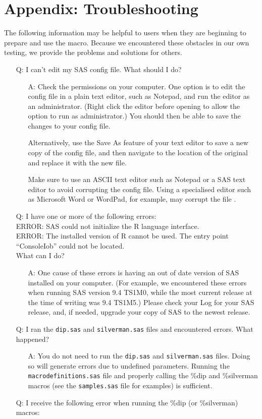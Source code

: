 \documentclass[]{interact}
\theoremstyle{plain}%
\theoremstyle{definition}
\theoremstyle{remark}
\begin{document}
\section{Appendix: Troubleshooting}
The following information may be helpful to users when they are beginning to prepare and use the macro. Because we encountered these obstacles in our own testing, we provide the problems and solutions for others.
\begin{itemize}
\item[Q:] I can't edit my SAS config file. What should I do?
\begin{itemize}
\item[A:] Check the permissions on your computer. One option is to edit the config file in a plain text editor, such as Notepad, and run the editor as an administrator. (Right click the editor before opening to allow the option to run as administrator.) You should then be able to save the changes to your config file. 

Alternatively, use the Save As feature of your text editor to save a new copy of the config file, and then navigate to the location of the original and replace it with the new file. 

Make sure to use an ASCII text editor such as Notepad or a SAS text editor to avoid corrupting the config file. Using a specialised editor such as Microsoft Word or WordPad, for example, may corrupt the file \citep[p. 14]{SAS-config}.
\end{itemize}
\item[Q:] I have one or more of the following errors: \\
ERROR: SAS could not initialize the R language interface. \\
ERROR: The installed version of R cannot be used.  The entry point ``ConsoleIob'' could not be located. \\
What can I do?
\begin{itemize}
\item[A:] One cause of these errors is having an out of date version of SAS installed on your computer. (For example, we encountered these errors when running SAS version 9.4 TS1M0, while the most current release at the time of writing was 9.4 TS1M5.)  Please check your Log for your SAS release, and, if needed, upgrade your copy of SAS to the newest release. 
\end{itemize}
\item[Q:] I ran the \texttt{dip.sas} and \texttt{silverman.sas} files and encountered errors. What happened? 
\begin{itemize}
\item[A:]  You do not need to run the \texttt{dip.sas} and \texttt{silverman.sas} files. Doing so will generate errors due to undefined parameters. Running the \texttt{macrodefinitions.sas} file and properly calling the \%dip and \%silverman macros (see the \texttt{samples.sas} file for examples) is sufficient.
\end{itemize}
\item[Q:] I receive the following error when running the \%dip (or \%silverman) macros:


\end{itemize}
\end{document}
